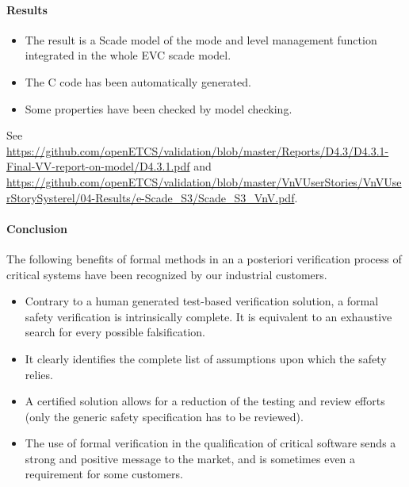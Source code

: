 \paragraph{Results}


\begin{itemize}
\item The result is a Scade model of the mode and level management function integrated in the whole EVC scade model.
\item The C code has been automatically  generated.
\item Some properties have been checked by model checking.
\end{itemize}

See {\url{https://github.com/openETCS/validation/blob/master/Reports/D4.3/D4.3.1-Final-VV-report-on-model/D4.3.1.pdf}} and {\url{https://github.com/openETCS/validation/blob/master/VnVUserStories/VnVUserStorySysterel/04-Results/e-Scade_S3/Scade_S3_VnV.pdf}}.





\paragraph{Conclusion}



The following benefits of formal methods in an a posteriori verification process of
critical systems have been recognized by our industrial customers.
%
\begin{itemize}
\item Contrary to a human generated test-based verification solution, a formal safety verification is
intrinsically complete. It is equivalent to an exhaustive search for every possible falsification.
\item It clearly identifies the complete list of assumptions upon which the safety relies.
\item A certified solution allows for a reduction of the testing and review efforts (only the generic safety
specification has to be reviewed).
\item The use of formal verification in the qualification of critical software sends a strong
and positive message to the market, and is sometimes even a requirement for some customers.
\end{itemize}

